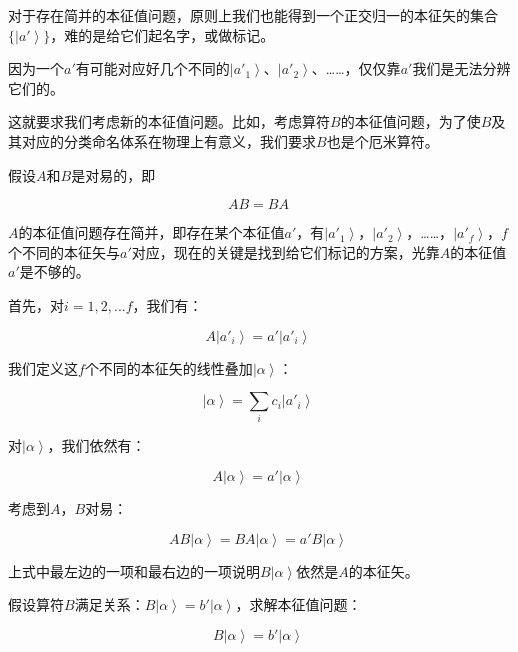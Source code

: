 对于存在简并的本征值问题，原则上我们也能得到一个正交归一的本征矢的集合$\{ \left| a' \right\rangle \}$，难的是给它们起名字，或做标记。

因为一个$a'$有可能对应好几个不同的$\left| a'_1 \right\rangle $、$\left| a'_2 \right\rangle $、……，仅仅靠$a'$我们是无法分辨它们的。

这就要求我们考虑新的本征值问题。比如，考虑算符$B$的本征值问题，为了使$B$及其对应的分类命名体系在物理上有意义，我们要求$B$也是个厄米算符。

假设$A$和$B$是对易的，即

\begin{equation}
AB = BA~
\end{equation}

$A$的本征值问题存在简并，即存在某个本征值$a'$，有$\left| a'_1 \right\rangle$，$\left| a'_2 \right\rangle$，……，$\left| a'_f \right\rangle$，$f$个不同的本征矢与$a'$对应，现在的关键是找到给它们标记的方案，光靠$A$的本征值$a'$是不够的。

首先，对$i = 1, 2,... f$，我们有：

\begin{equation}
A \left| a'_i \right\rangle = a' \left| a'_i \right\rangle ~
\end{equation}

我们定义这$f$个不同的本征矢的线性叠加$\left| \alpha \right\rangle $：

\begin{equation}
\left| \alpha \right\rangle = \sum\limits_i c_i \left| a'_i \right\rangle~
\end{equation}

对$\left| \alpha \right\rangle $，我们依然有：

\begin{equation}
A \left| \alpha \right\rangle  = a' \left| \alpha \right\rangle~
\end{equation}

考虑到$A$，$B$对易：

\begin{equation}
AB \left| \alpha \right\rangle = B A \left| \alpha \right\rangle = a' B \left| \alpha \right\rangle~
\end{equation}

上式中最左边的一项和最右边的一项说明$B \left| \alpha \right\rangle $依然是$A$的本征矢。

假设算符$B$满足关系：$B \left| \alpha \right\rangle = b' \left| \alpha \right\rangle$，求解本征值问题：

\begin{equation}
B \left| \alpha \right\rangle = b' \left| \alpha \right\rangle~
\end{equation}

